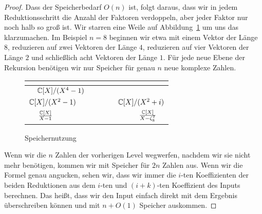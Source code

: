 \begin{proof}
    \medskip
    Dass der Speicherbedarf $O(n)$ ist, folgt daraus, dass wir in jedem Reduktionsschritt die Anzahl der Faktoren verdoppeln, aber jeder Faktor nur noch halb so groß ist. Wir starren eine Weile auf Abbildung~\ref{fig:fft:memory_n_equals_8} um uns das klarzumachen. Im Beispiel $n=8$ beginnen wir etwa mit einem Vektor der Länge $8$, reduzieren auf zwei Vektoren der Länge $4$, reduzieren auf vier Vektoren der Länge $2$ und schließlich acht Vektoren der Länge $1$. Für jede neue Ebene der Rekursion benötigen wir nur Speicher für genau $n$ neue komplexe Zahlen.
    \begin{figure}[htb]
        \begin{tabular}{|C{0.125}|C{0.125}|C{0.125}|C{0.125}|C{0.125}|C{0.125}|C{0.125}|C{0.125}|}
            \hline
             \\
            \hline
             &
             \\
            \hline
             &
             &
             &
             \\
            \hline
                          {$\frac{\mathbb{C}[X]}{X-1}$} &
             &
             &
             &
             &
             &
             &
                   {$\frac{\mathbb{C}[X]}{X-\zeta_8^7}$} \\
            \hline
        \end{tabular}
        \caption{Speichernutzung}
        \label{fig:fft:memory_n_equals_8}
    \end{figure}

    Wenn wir die $n$ Zahlen der vorherigen Level wegwerfen, nachdem wir sie nicht mehr benötigen, kommen wir mit Speicher für $2n$ Zahlen aus. Wenn wir die Formel genau angucken, sehen wir, dass wir immer die $i$-ten Koeffizienten der beiden Reduktionen aus dem $i$-ten und $(i+k)$-ten Koeffizient des Inputs berechnen. Das heißt, dass wir den Input einfach direkt mit dem Ergebnis überschreiben können und mit $n+O(1)$ Speicher auskommen.
\end{proof}

